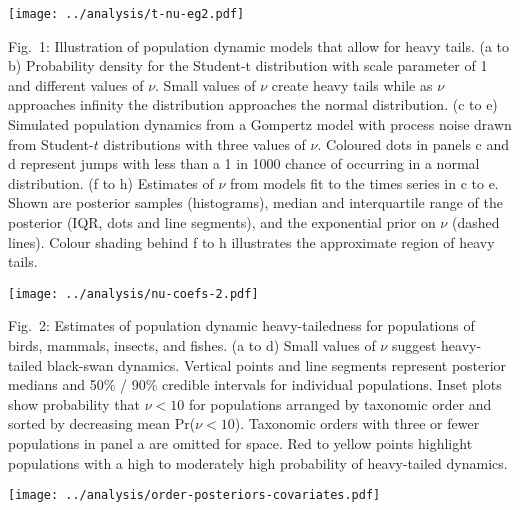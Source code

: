 \clearpage


\begin{center}
\texttt{[image: ../analysis/t-nu-eg2.pdf]}
\end{center}

Fig.~1: Illustration of population dynamic models that allow for heavy
tails. (a to b) Probability density for the Student-t
distribution with scale parameter of 1 and different values of \(\nu\). Small
values of \(\nu\) create heavy tails while as \(\nu\) approaches infinity the
distribution approaches the normal distribution. (c to e)
Simulated population dynamics from a Gompertz model with process noise drawn
from Student-$t$ distributions with three values of \(\nu\). Coloured dots in
panels c and d represent jumps with less than a 1 in 1000
chance of occurring in a normal distribution. (f to h)
Estimates of \(\nu\) from models fit to the times series in c to
e. Shown are posterior samples (histograms), median and interquartile
range of the posterior (IQR, dots and line segments), and the exponential prior
on \(\nu\) (dashed lines). Colour shading behind f to h
illustrates the approximate region of heavy tails.

\clearpage

\begin{center}
\texttt{[image: ../analysis/nu-coefs-2.pdf]}
\end{center}

Fig.~2: Estimates of population dynamic heavy-tailedness for
populations of birds, mammals, insects, and fishes. (a to d)
Small values of \(\nu\) suggest heavy-tailed black-swan dynamics. Vertical
points and line segments represent posterior medians and 50\% / 90\% credible
intervals for individual populations. Inset plots show probability that \(\nu
< 10\) for populations arranged by taxonomic order and sorted by decreasing
mean Pr(\(\nu < 10\)). Taxonomic orders with three or fewer populations in
panel a are omitted for space. Red to yellow points highlight populations
with a high to moderately high probability of heavy-tailed dynamics.

\clearpage

\begin{center}
\texttt{[image: ../analysis/order-posteriors-covariates.pdf]}
\end{center}

